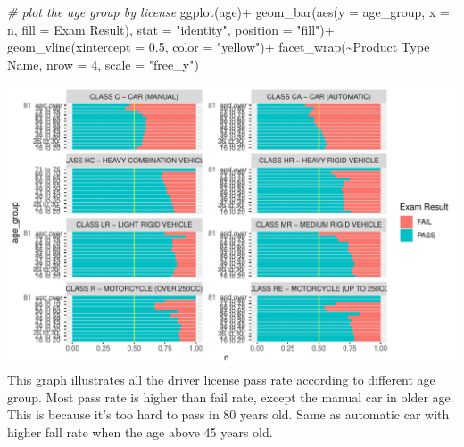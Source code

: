 \documentclass[11pt,a4paper,]{article}
\newenvironment{Shaded}{\begin{snugshade}}{\end{snugshade}}
\newcommand{\AttributeTok}[1]{\textcolor[rgb]{0.77,0.63,0.00}{#1}}
\newcommand{\CommentTok}[1]{\textcolor[rgb]{0.56,0.35,0.01}{\textit{#1}}}
\newcommand{\DecValTok}[1]{\textcolor[rgb]{0.00,0.00,0.81}{#1}}
\newcommand{\FloatTok}[1]{\textcolor[rgb]{0.00,0.00,0.81}{#1}}
\newcommand{\FunctionTok}[1]{\textcolor[rgb]{0.00,0.00,0.00}{#1}}
\newcommand{\NormalTok}[1]{#1}
\newcommand{\SpecialCharTok}[1]{\textcolor[rgb]{0.00,0.00,0.00}{#1}}
\newcommand{\StringTok}[1]{\textcolor[rgb]{0.31,0.60,0.02}{#1}}
\begin{document}
\begin{Shaded}
\begin{Highlighting}[]
\CommentTok{\# plot the age group by license}
\FunctionTok{ggplot}\NormalTok{(age)}\SpecialCharTok{+}
  \FunctionTok{geom\_bar}\NormalTok{(}\FunctionTok{aes}\NormalTok{(}\AttributeTok{y =}\NormalTok{ age\_group,}
               \AttributeTok{x =}\NormalTok{ n,}
               \AttributeTok{fill =} \StringTok{\textasciigrave{}}\AttributeTok{Exam Result}\StringTok{\textasciigrave{}}\NormalTok{),}
           \AttributeTok{stat =} \StringTok{"identity"}\NormalTok{,}
           \AttributeTok{position =} \StringTok{"fill"}\NormalTok{)}\SpecialCharTok{+}
  \FunctionTok{geom\_vline}\NormalTok{(}\AttributeTok{xintercept =} \FloatTok{0.5}\NormalTok{, }\AttributeTok{color =} \StringTok{"yellow"}\NormalTok{)}\SpecialCharTok{+}
  \FunctionTok{facet\_wrap}\NormalTok{(}\SpecialCharTok{\textasciitilde{}}\StringTok{\textasciigrave{}}\AttributeTok{Product Type Name}\StringTok{\textasciigrave{}}\NormalTok{, }\AttributeTok{nrow =} \DecValTok{4}\NormalTok{,}
             \AttributeTok{scale =} \StringTok{"free\_y"}\NormalTok{)}
\end{Highlighting}
\end{Shaded}

\includegraphics{Assignment4_files/figure-latex/unnamed-chunk-6-1.pdf}
This graph illustrates all the driver license pass rate according to different age group. Most pass rate is higher than fail rate, except the manual car in older age. This is because it's too hard to pass in 80 years old. Same as automatic car with higher fall rate when the age above 45 years old.
\end{document}
